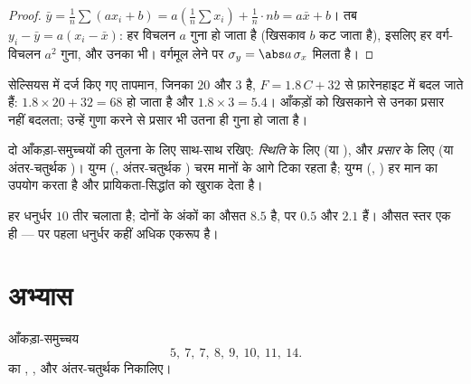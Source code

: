 \begin{proof}
$\bar y = \frac1n \sum (a x_i + b) = a\left(\frac1n\sum x_i\right) +
\frac1n \cdot nb = a\bar x + b$। तब $y_i - \bar y = a(x_i - \bar x)$: हर विचलन $a$ गुना हो जाता है (खिसकाव $b$ कट जाता है),
इसलिए हर वर्ग-विचलन $a^2$ गुना, और उनका  भी। वर्गमूल लेने पर $\sigma_y = \abs a\,\sigma_x$ मिलता
है।
\end{proof}

\begin{example}
सेल्सियस में दर्ज किए गए तापमान, जिनका  $20$ और  $3$ है,
$F = 1.8\,C + 32$ से फ़ारेनहाइट में बदल जाते हैं:  $1.8 \times 20 + 32 = 68$ हो जाता है और 
$1.8 \times 3 = 5.4$। आँकड़ों को खिसकाने से उनका प्रसार नहीं बदलता; उन्हें गुणा करने से
प्रसार भी उतना ही गुना हो जाता है।
\end{example}

\begin{method}[आँकड़ों का सारांश और तुलना]\label{met:g11:stat:compare}
दो आँकड़ा-समुच्चयों की तुलना के लिए साथ-साथ रखिए: \emph{स्थिति} के लिए 
(या ), और \emph{प्रसार} के लिए  (या अंतर-चतुर्थक )।
युग्म (, अंतर-चतुर्थक ) चरम मानों के आगे टिका रहता है; युग्म
(, ) हर मान का उपयोग करता है और प्रायिकता-सिद्धांत को खुराक
देता है।
\end{method}

\begin{example}
हर धनुर्धर $10$ तीर चलाता है; दोनों के अंकों का औसत $8.5$ है, पर  $0.5$ और $2.1$ हैं। औसत स्तर एक ही --- पर पहला धनुर्धर कहीं अधिक
एकरूप है।
\end{example}

\section{अभ्यास}

\begin{exercise}[$\star$]\label{exo:g11:stat:1}
आँकड़ा-समुच्चय
\[
5,\ 7,\ 7,\ 8,\ 9,\ 10,\ 11,\ 14 .
\]
का , ,  और अंतर-चतुर्थक  निकालिए।
\end{exercise}

